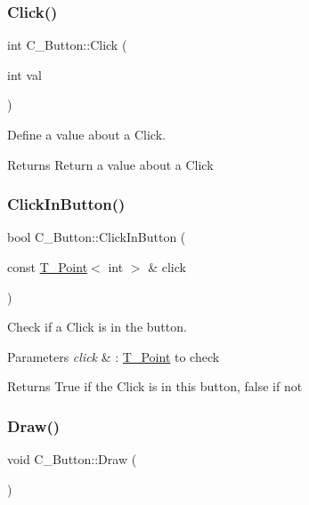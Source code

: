 \subsubsection{\texorpdfstring{Click()}{Click()}}
{\footnotesize\ttfamily int C\+\_\+\+Button\+::\+Click (\begin{DoxyParamCaption}\item[{int}]{val }\end{DoxyParamCaption})}



Define a value about a Click. 

\begin{DoxyReturn}{Returns}
Return a value about a Click 
\end{DoxyReturn}
\mbox{\label{classC__Button_a805c797b9afdddb5896a516a3e783882}} 
\subsubsection{\texorpdfstring{Click\+In\+Button()}{ClickInButton()}}
{\footnotesize\ttfamily bool C\+\_\+\+Button\+::\+Click\+In\+Button (\begin{DoxyParamCaption}\item[{const \hyperlink{classT__Point}{T\+\_\+\+Point}$<$ int $>$ \&}]{click }\end{DoxyParamCaption})}



Check if a Click is in the button. 


\begin{DoxyParams}{Parameters}
{\em click} & \+: \hyperlink{classT__Point}{T\+\_\+\+Point} to check \\
\hline
\end{DoxyParams}
\begin{DoxyReturn}{Returns}
True if the Click is in this button, false if not 
\end{DoxyReturn}
\mbox{\label{classC__Button_a71f9a7d92a30818af1539104e6b963fb}} 
\subsubsection{\texorpdfstring{Draw()}{Draw()}\hspace{0.1cm}{\footnotesize\ttfamily [1/2]}}
{\footnotesize\ttfamily void C\+\_\+\+Button\+::\+Draw (\begin{DoxyParamCaption}{ }\end{DoxyParamCaption})}



